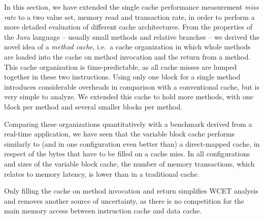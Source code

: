 In this section, we have extended the single cache performance
measurement \emph{miss rate} to a two value set, memory read and
transaction rate, in order to perform a more detailed evaluation of
different cache architectures. From the properties of the Java
language -- usually small methods and relative branches -- we
derived the novel idea of a \emph{method cache}, i.e.\ a cache
organization in which whole methods are loaded into the cache on
method invocation and the return from a method. This cache
organization is time-predictable, as all cache misses are lumped
together in these two instructions. Using only one block for a
single method introduces considerable overheads in comparison with a
conventional cache, but is very simple to analyze. We extended this
cache to hold more methods, with one block per method and several
smaller blocks per method.

Comparing these organizations quantitatively with a benchmark
derived from a real-time application, we have seen that the
variable block cache performs similarly to (and in one configuration
even better than) a direct-mapped cache, in respect of the bytes
that have to be filled on a cache miss. In all configurations and
sizes of the variable block cache, the number of memory
transactions, which relates to memory latency, is lower than in a
traditional cache.

Only filling the cache on method invocation and return simplifies
WCET analysis and removes another source of uncertainty, as there is
no competition for the main memory access between instruction cache
and data cache.


